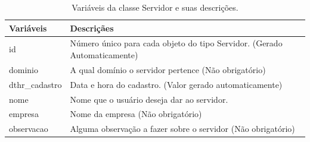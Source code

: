 \begin{table}[!ht]
\centering
\begin{tabular}{|l|l|}
\hline
{\color[HTML]{000000} \textbf{Variáveis}} & {\color[HTML]{000000} \textbf{Descriçães}}                                                                \\ \hline
id                                     & \multicolumn{1}{p{13.00cm}|}{Número único para cada objeto do tipo Servidor. (Gerado Automaticamente) }\\ \hline
dominio                                & \multicolumn{1}{p{13.00cm}|}{A qual domínio o servidor pertence (Não obrigatório)} \\ \hline
dthr\_cadastro                         & \multicolumn{1}{p{13.00cm}|}{Data e hora do cadastro. (Valor gerado automaticamente)} \\ \hline
nome                                   & \multicolumn{1}{p{13.00cm}|}{Nome que o usuário deseja dar ao servidor.}  \\ \hline
empresa                                & \multicolumn{1}{p{13.00cm}|}{Nome da empresa (Não obrigatório)} \\ \hline
observacao                             & \multicolumn{1}{p{13.00cm}|}{Alguma observação a fazer sobre o servidor (Não obrigatório)} \\ \hline
\end{tabular}
\caption[Variáveis da classe Servidor e suas descrições.]{Variáveis da classe Servidor e suas descrições.}
\label{Tab:VariaveisServidor}
\end{table}

